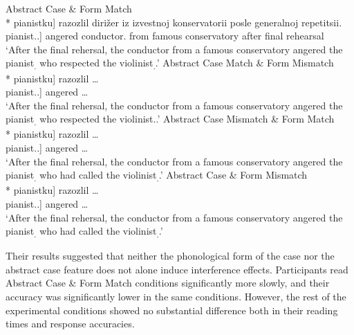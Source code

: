 \ea \label{ex:fed04}
  \ea \label{ex:fed04-femacc} {Abstract Case \& Form Match}\\*
    \gll [[Uva\v{z}av\v{s}uju skripa\v{c}k{u}] pianistk{u}] razozlil diri\v{z}er iz izvestnoj konservatorii posle generalnoj repetitsii.\\
    [[respecting violinist.\F{}.\Acc{}] pianist.\F{}.\Acc{}] angered conductor.\Nom{} from famous conservatory after final rehearsal\\
    \glt `After the final rehersal, the conductor from a famous conservatory angered the pianist\textsubscript{\F{}.\Acc{}} who respected the violinist\textsubscript{\F{}.\Acc{}}.'
  \ex \label{ex:fed04-mascacc} {Abstract Case Match \& Form Mismatch}\\*
  \gll [[Uva\v{z}av\v{s}uju skripa\v{c}k{a}] pianistk{u}] razozlil \ldots{}\\
  [[respecting violinist.\M{}.\Acc{}] pianist.\F{}.\Acc{}] angered \ldots{}\\
  \glt `After the final rehersal, the conductor from a famous conservatory angered the pianist\textsubscript{\F{}.\Acc{}} who respected the violinist\textsubscript{\M{}}.\Acc{}.'
  \ex \label{ex:fed04-mascdat} {Abstract Case Mismatch \& Form Match}\\*
  \gll [[Pozvoniv\v{s}uju skripa\v{c}k{u}] pianistk{u}] razozlil \ldots{}\\
  [[having\_called violinist.\M{}.\Acc{}] pianist.\F{}.\Acc{}] angered \ldots{}\\
  \glt `After the final rehersal, the conductor from a famous conservatory angered the pianist\textsubscript{\F{}.\Acc{}} who had called the violinist\textsubscript{\M{}.\Acc{}}.'
  \ex \label{ex:fed04-femdat} {Abstract Case \& Form Mismatch}\\*
  \gll [[Pozvoniv\v{s}uju skripa\v{c}k{e}] pianistk{u}] razozlil \ldots{}\\
  [[having\_called violinist.\F{}.\Dat{}] pianist.\F{}.\Acc{}] angered \ldots{}\\
  \glt `After the final rehersal, the conductor from a famous conservatory angered the pianist\textsubscript{\F{}.\Dat{}} who had called the violinist\textsubscript{\F{}.\Acc{}}.'
  \z
\z

Their results suggested that neither the phonological form of the case nor the abstract case feature does not alone induce interference effects. Participants read {Abstract Case \& Form Match} conditions significantly more slowly, and their accuracy was significantly lower in the same conditions. However, the rest of the experimental conditions showed no substantial difference both in their reading times and response accuracies. 

